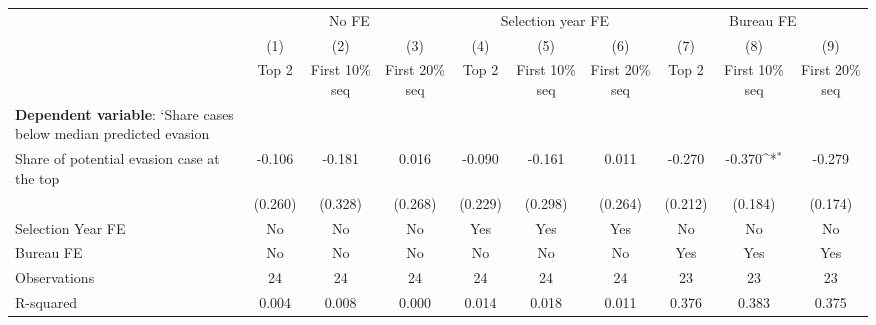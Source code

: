 {
\def\sym#1{\ifmmode^{#1}\else\(^{#1}\)\fi}
\begin{tabular}{l*{9}{c}}
\toprule
            &\multicolumn{3}{c}{No FE}                                        &\multicolumn{3}{c}{Selection year FE}                            &\multicolumn{3}{c}{Bureau FE}                                    \\\cmidrule(lr){2-4}\cmidrule(lr){5-7}\cmidrule(lr){8-10}
            &\multicolumn{1}{c}{(1)}&\multicolumn{1}{c}{(2)}&\multicolumn{1}{c}{(3)}&\multicolumn{1}{c}{(4)}&\multicolumn{1}{c}{(5)}&\multicolumn{1}{c}{(6)}&\multicolumn{1}{c}{(7)}&\multicolumn{1}{c}{(8)}&\multicolumn{1}{c}{(9)}\\
            &\multicolumn{1}{c}{Top 2}&\multicolumn{1}{c}{First 10\% seq}&\multicolumn{1}{c}{First 20\% seq}&\multicolumn{1}{c}{Top 2}&\multicolumn{1}{c}{First 10\% seq}&\multicolumn{1}{c}{First 20\% seq}&\multicolumn{1}{c}{Top 2}&\multicolumn{1}{c}{First 10\% seq}&\multicolumn{1}{c}{First 20\% seq}\\
\midrule
\textbf{Dependent variable}: `Share cases below median predicted evasion&                     &                     &                     &                     &                     &                     &                     &                     &                     \\
\addlinespace
Share of potential evasion case at the top&      -0.106         &      -0.181         &       0.016         &      -0.090         &      -0.161         &       0.011         &      -0.270         &      -0.370\sym{*}  &      -0.279         \\
            &     (0.260)         &     (0.328)         &     (0.268)         &     (0.229)         &     (0.298)         &     (0.264)         &     (0.212)         &     (0.184)         &     (0.174)         \\
\midrule
Selection Year FE&          No         &          No         &          No         &         Yes         &         Yes         &         Yes         &          No         &          No         &          No         \\
Bureau FE   &          No         &          No         &          No         &          No         &          No         &          No         &         Yes         &         Yes         &         Yes         \\
Observations&          24         &          24         &          24         &          24         &          24         &          24         &          23         &          23         &          23         \\
R-squared   &       0.004         &       0.008         &       0.000         &       0.014         &       0.018         &       0.011         &       0.376         &       0.383         &       0.375         \\
\bottomrule
\end{tabular}
}
